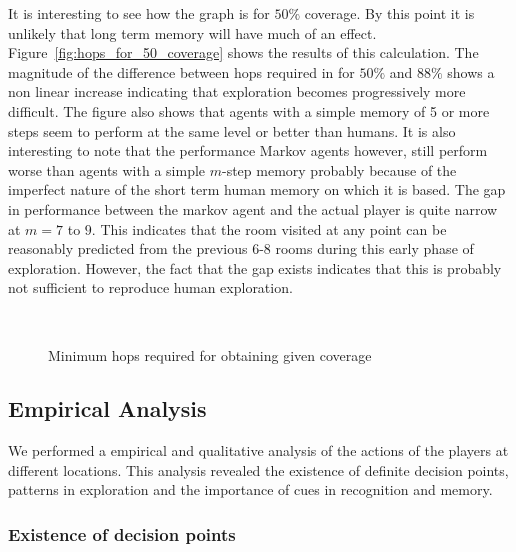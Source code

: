 It is interesting to see how the graph is for $50\%$ coverage. By this point it is unlikely that long term memory will have much of an effect. Figure~\ref{fig:hops_for_50_coverage} shows the results of this calculation. The magnitude of the difference between hops required in for $50\%$ and $88\%$ shows a non linear increase indicating that exploration becomes progressively more difficult. The figure also shows that agents with a simple memory of 5 or more steps seem to perform at the same level or better than humans. It is also interesting to note that the performance Markov agents however, still perform worse than agents with a simple $m$-step memory probably because of the imperfect nature of the short term human memory on which it is based. The gap in performance between the markov agent and the actual player is quite narrow at $m = 7$ to $9$. This indicates that the room visited at any point can be reasonably predicted from the previous 6-8 rooms during this early phase of exploration. However, the fact that the gap exists indicates that this is probably not sufficient to reproduce human exploration.

\begin{figure}[tb]
    \centering
   \\

    \caption{Minimum hops required for obtaining given coverage}
\end{figure}





\subsection{Empirical Analysis} %
\label{sec:empiricalanalysis}

We performed a empirical and qualitative analysis of the actions of the players at different locations. This analysis revealed the existence of definite decision points, patterns in exploration and the importance of cues in recognition and memory.



\subsubsection{Existence of decision points} %
\label{sec:definite_decision_points}

